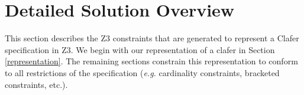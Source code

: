 \documentclass{easychair}
\newcommand{\eg}{\emph{e.g.}\xspace}
\begin{document}


\section{Detailed Solution Overview}
\label{detailedsolution}
This section describes the Z3 constraints that are generated to represent a Clafer specification in Z3. We begin with our representation of a clafer in Section \ref{representation}. The remaining sections constrain this representation to conform to all restrictions of the specification (\eg cardinality constraints, bracketed constraints, etc.).
\end{document}
